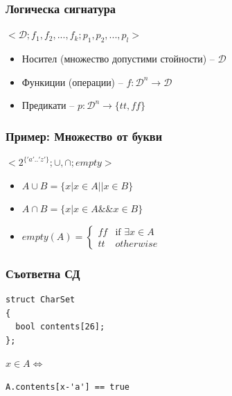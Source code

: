 \documentclass{beamer}
\begin{document}
\begin{frame}[fragile]
\frametitle{Логическа сигнатура}


\begin{center}
$<\mathcal{D};f_1,f_2,...,f_k;p_1,p_2,...,p_l>$
\end{center}

\begin{itemize}
  \item Носител (множество допустими стойности) -- $\mathcal{D}$
  \item Функиции (операции) -- $f:\mathcal{D}^{n}\rightarrow\mathcal{D}$
  \item Предикати -- $p:\mathcal{D}^{n}\rightarrow\{tt,ff\}$
\end{itemize}

\end{frame}


\begin{frame}[fragile]
\frametitle{Пример: Множество от букви}


\begin{center}
$<2^{\{'a'..'z'\}};\cup,\cap;empty >$
\end{center}

\begin{itemize}
  \item $A \cup B = \{x | x \in A || x \in B\}$
  \item $A \cap B = \{x | x \in A \&\& x \in B\}$
  \item $empty(A) = \left\{
  \begin{array}{ll}
    ff  & \mbox{if } \exists x \in A \\
    tt & otherwise
  \end{array}
\right.$
\end{itemize}

\end{frame}


\begin{frame}[fragile]
\frametitle{Съответна СД}


\begin{flushleft}
\begin{lstlisting}
struct CharSet
{
  bool contents[26];
};
\end{lstlisting}  
\end{flushleft}

\begin{flushleft}
$x \in A \Leftrightarrow $ 
\begin{lstlisting}
A.contents[x-'a'] == true
\end{lstlisting}
\end{flushleft}

\end{frame}
\end{document}
